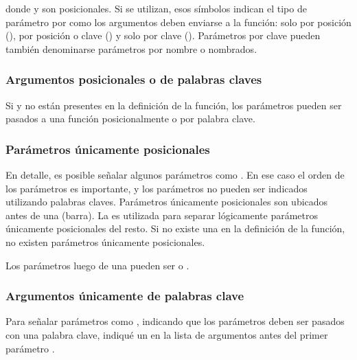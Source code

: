 \documentclass[a4,10pt,spanish]{sphinxmanual}
\begin{document}
\sphinxAtStartPar
donde \sphinxcode{\sphinxupquote{/}} y \sphinxcode{\sphinxupquote{*}} son posicionales. Si se utilizan, esos símbolos indican el tipo de parámetro por como los argumentos deben enviarse a la función: solo por posición (), por posición o clave () y solo por clave (). Parámetros por clave pueden también denominarse parámetros por nombre o nombrados.


\subsubsection{Argumentos posicionales o de palabras claves}
\label{\detokenize{tutorial/controlflow:positional-or-keyword-arguments}}
\sphinxAtStartPar
Si \sphinxcode{\sphinxupquote{/}} y \sphinxcode{\sphinxupquote{*}} no están presentes en la definición de la función, los parámetros pueden ser pasados a una función posicionalmente o por palabra clave.


\subsubsection{Parámetros únicamente posicionales}
\label{\detokenize{tutorial/controlflow:positional-only-parameters}}
\sphinxAtStartPar
En detalle, es posible señalar algunos parámetros como . En ese caso el orden de los parámetros es importante, y los parámetros no pueden ser indicados utilizando palabras claves. Parámetros únicamente posicionales son ubicados antes de una \sphinxcode{\sphinxupquote{/}} (barra). La \sphinxcode{\sphinxupquote{/}} es utilizada para separar lógicamente parámetros únicamente posicionales del resto. Si no existe una \sphinxcode{\sphinxupquote{/}} en la definición de la función, no existen parámetros únicamente posicionales.

\sphinxAtStartPar
Los parámetros luego de una \sphinxcode{\sphinxupquote{/}} pueden ser  o .


\subsubsection{Argumentos únicamente de palabras clave}
\label{\detokenize{tutorial/controlflow:keyword-only-arguments}}
\sphinxAtStartPar
Para señalar parámetros como , indicando que los parámetros deben ser pasados con una palabra clave, indiqué un \sphinxcode{\sphinxupquote{*}} en la lista de argumentos antes del primer parámetro .
\end{document}

